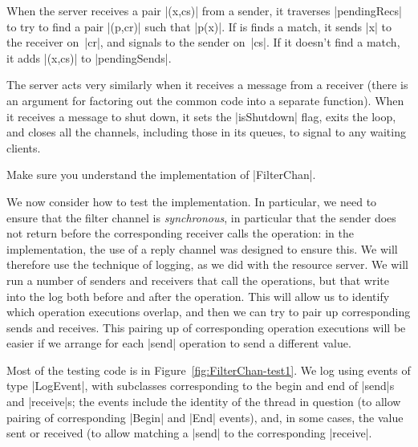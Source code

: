 When the server receives a pair |(x,cs)| from a sender, it traverses
|pendingRecs| to try to find a pair |(p,cr)| such that |p(x)|.  If is finds a
match, it sends |x| to the receiver on~|cr|, and signals to the sender
on~|cs|.  If it doesn't find a match, it adds |(x,cs)| to |pendingSends|.

The server acts very similarly when it receives a message from a receiver
(there is an argument for factoring out the common code into a separate
function).  When it receives a message to shut down, it sets the |isShutdown|
flag, exits the loop, and closes all the channels, including those in its
queues, to signal to any waiting clients.

\begin{instruction}
Make sure you understand the implementation of |FilterChan|.
\end{instruction}


We now consider how to test the implementation.  In particular, we need to
ensure that the filter channel is \emph{synchronous}, in particular that the
sender does not return before the corresponding receiver calls the operation:
in the implementation, the use of a reply channel was designed to ensure this.
We will therefore use the technique of logging, as we did with the resource
server.  We will run a number of senders and receivers that call the
operations, but that write into the log both before and after the operation.
This will allow us to identify which operation executions overlap, and then we
can try to pair up corresponding sends and receives.  
%
This pairing up of corresponding operation executions will be easier if we
arrange for each |send| operation to send a different value.  

Most of the testing code is in Figure~\ref{fig:FilterChan-test1}. 
We log using events of type |LogEvent|, with subclasses corresponding to the
begin and end of |send|s and |receive|s; the events include the identity of
the thread in question (to allow pairing of corresponding |Begin| and |End|
events), and, in some cases, the value sent or received (to allow matching a
|send| to the corresponding |receive|.


